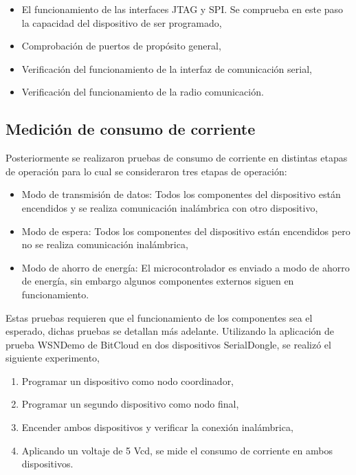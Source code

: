\begin{itemize}
\item El funcionamiento de las interfaces JTAG y SPI. Se comprueba en este paso la capacidad del dispositivo de ser programado, 
\item Comprobaci\'on de puertos de prop\'osito general,
\item Verificaci\'on del funcionamiento de la interfaz de comunicaci\'on serial, 
\item Verificaci\'on del funcionamiento de la radio comunicaci\'on.
\end{itemize}



\subsection{Medici\'on de consumo de corriente}

Posteriormente se realizaron pruebas de consumo de corriente en distintas etapas de operaci\'on para lo cual se consideraron tres etapas de operaci\'on: 

\begin{itemize}
\item Modo de transmisi\'on de datos: Todos los componentes del dispositivo est\'an encendidos y se realiza comunicaci\'on inal\'ambrica con otro dispositivo,
\item Modo de espera: Todos los componentes del dispositivo est\'an encendidos pero no se realiza comunicaci\'on inal\'ambrica, 
\item Modo de ahorro de energ\'ia: El microcontrolador es enviado a modo de ahorro de energ\'ia, sin embargo algunos componentes externos siguen en funcionamiento. 
\end{itemize}

Estas pruebas requieren que el funcionamiento de los componentes sea el esperado, dichas pruebas se detallan m\'as adelante. Utilizando la aplicaci\'on de prueba WSNDemo de BitCloud en dos dispositivos SerialDongle, se realiz\'o el siguiente experimento,

\begin{enumerate}
\item Programar un dispositivo como nodo coordinador,
\item Programar un segundo dispositivo como nodo final,
\item Encender ambos dispositivos y verificar la conexi\'on inal\'ambrica,
\item Aplicando un voltaje de 5 Vcd, se mide el consumo de corriente en ambos dispositivos. 
\end{enumerate}

